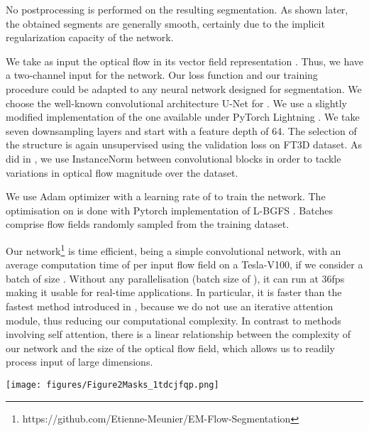 \documentclass[10pt,twocolumn,letterpaper]{article}
\begin{document}
No postprocessing is performed on the resulting segmentation. As shown later, the obtained segments are generally smooth, certainly due to the implicit regularization capacity of the network.

We take as input the optical flow in its vector field representation . Thus, we have a two-channel input for the network. Our loss function and our training procedure could be adapted to any neural network designed for segmentation. We choose the well-known convolutional architecture U-Net \cite{ronneberger_Unet_2015} for . We use a slightly modified implementation of the one available under PyTorch Lightning \cite{lightningbolt20}. We take seven downsampling layers and start with a feature depth of 64. The selection of the structure is again unsupervised using the validation loss on FT3D dataset. As did in \cite{meunier2021}, we use InstanceNorm between convolutional blocks in order to tackle variations in optical flow magnitude over the dataset.

We use Adam \cite{adam2014} optimizer with a learning rate of  to train the network. 
The optimisation on  is done with Pytorch implementation of L-BGFS \cite{lbgfs89}. {\color{black} Batches comprise flow fields randomly sampled from the training dataset.}

Our network\footnote{https://github.com/Etienne-Meunier/EM-Flow-Segmentation} is time efficient, being a simple convolutional network, with an average computation time of  per  input flow field on a Tesla-V100, if we consider a batch of size . Without any parallelisation (batch size of ), it can run at 36fps making it usable for real-time applications. In particular, it is faster than the fastest method introduced in \cite{yang_motion-grouping_2021}, because we do not use an iterative attention module, thus reducing our computational complexity. In contrast to methods involving self attention, there is a linear relationship between the complexity of our network and the size of the optical flow field, which allows us to readily process input of large dimensions.




\begin{figure*}[tbh]
\texttt{[image: figures/Figure2Masks\_1tdcjfqp.png]}
 \vspace{-0.5cm}
\caption{Examples of motion segmentation results obtained with our method with two masks, on the videos bmx-trees, breakdance-flare, scooter-black, kite-surf, blackswan, parkour, dogs02 and cuttlefish 1, of the DAVIS2016, FBMS and MoCA datasets. First row: a frame of the video with the ground-truth superimposed in yellow. Second row: the input flow field displayed with the HSV color code \cite{middlebury} {\color{black} that is depicted in Fig.\ref{fig:flowchart}}. Third row: the segmentation produced by our method superimposed in green on the corresponding image.}
\label{fig:2masks}
 \vspace{-0.15cm}
\end{figure*}
\end{document}
